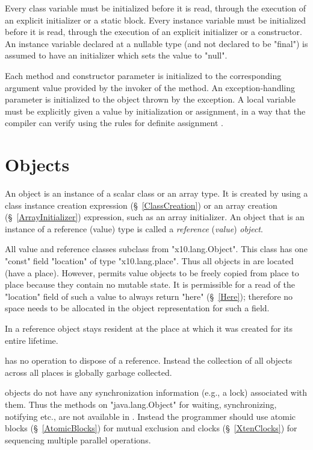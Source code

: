 Every class variable must be initialized before it is read, through
the execution of an explicit initializer or a static block. Every
instance variable must be initialized before it is read, through the
execution of an explicit initializer or a constructor.  An instance
variable declared at a nullable type (and not declared to be
\xcd"final") is assumed to have an initializer which sets the value to
\xcd"null".

Each method and constructor parameter is initialized to the
corresponding argument value provided by the invoker of the method. An
exception-handling parameter is initialized to the object thrown by
the exception. A local variable must be explicitly given a value by
initialization or assignment, in a way that the compiler can verify
using the rules for definite assignment \cite[\S~16]{jls2}.

\cbend

\section{Objects}\label{XtenObjects}

An object is an instance of a scalar class or an array type.  It is
created by using a class instance creation expression
(\S~\ref{ClassCreation}) or an array creation
(\S~\ref{ArrayInitializer}) expression, such as an array
initializer. An object that is an instance of a reference (value) type
is called a {\em reference} ({\em value}) {\em object}.

All value and reference classes subclass from \xcd"x10.lang.Object".
This class has one \xcd"const" field \xcd"location" of type
\xcd"x10.lang.place".  Thus all objects in \Xten{}
are located (have a place). However, \Xten{} permits value objects to
be freely copied from place to place because they contain no mutable
state.  It is permissible for a read of the \xcd"location" field of
such a value to always return \xcd"here" (\S~\ref{Here});
therefore no space needs to be allocated in the object representation
for such a field.

In \XtenCurrVer{} a reference object stays resident at the place at
which it was created for its entire lifetime.

{}\Xten{} has no operation to dispose of a reference.  Instead the
collection of all objects across all places is globally garbage
collected.

{}\Xten{} objects do not have any synchronization information (e.g.,
a lock) associated with them. Thus the methods on \xcd"java.lang.Object"
for waiting, synchronizing, notifying etc., are not
available in \Xten. Instead the programmer should use atomic blocks
(\S~\ref{AtomicBlocks}) for mutual exclusion and clocks
(\S~\ref{XtenClocks}) for sequencing multiple parallel operations.

